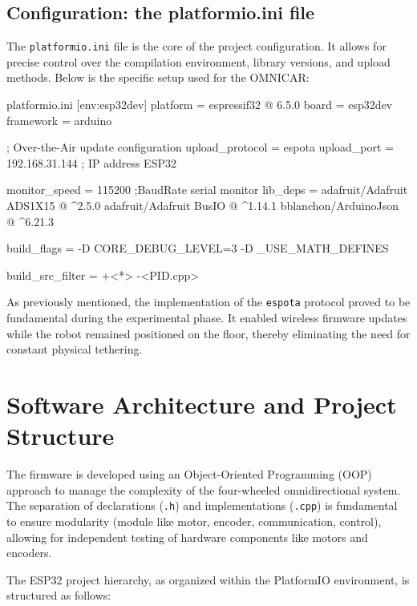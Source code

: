 \subsection{Configuration: the platformio.ini file}

The \texttt{platformio.ini} file is the core of the project configuration. It allows for precise control over the compilation environment, library versions, and upload methods. Below is the specific setup used for the OMNICAR:

\begin{vscode}{platformio.ini}
[env:esp32dev]
platform = espressif32 @ 6.5.0
board = esp32dev
framework = arduino

; Over-the-Air update configuration
upload_protocol = espota
upload_port = 192.168.31.144  	; IP address ESP32

monitor_speed = 115200 		  	;BaudRate serial monitor
lib_deps = 
    adafruit/Adafruit ADS1X15 @ ^2.5.0
    adafruit/Adafruit BusIO @ ^1.14.1
    bblanchon/ArduinoJson @ ^6.21.3

build_flags = 
    -D CORE_DEBUG_LEVEL=3
    -D _USE_MATH_DEFINES

build_src_filter = +<*> -<PID.cpp>
\end{vscode}

As previously mentioned, the implementation of the \texttt{espota} protocol proved to be fundamental during the experimental phase. It enabled wireless firmware updates while the robot remained positioned on the floor, thereby eliminating the need for constant physical tethering.

\section{Software Architecture and Project Structure}

The firmware is developed using an Object-Oriented Programming (OOP) approach to manage the complexity of the four-wheeled omnidirectional system. The separation of declarations (\texttt{.h}) and implementations (\texttt{.cpp}) is fundamental to ensure modularity (module like motor, encoder, communication, control), allowing for independent testing of hardware components like motors and encoders.

The ESP32 project hierarchy, as organized within the PlatformIO environment, is structured as follows:

